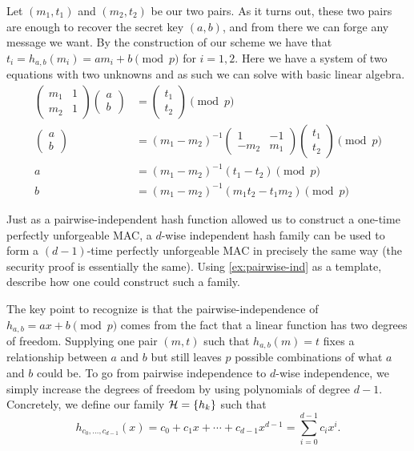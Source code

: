\documentclass[11pt]{article}
\begin{document}
\begin{answer}
  Let \((m_1, t_1)\) and \((m_2, t_2)\) be our two pairs. As it turns
  out, these two pairs are enough to recover the secret key \((a,b)\),
  and from there we can forge any message we want. By the construction
  of our scheme we have that \(t_i = h_{a,b}(m_i) = am_i + b \pmod p\)
  for \(i = 1,2\). Here we have a system of two equations with two
  unknowns and as such we can solve with basic linear algebra.
  \begin{align*}
    \begin{pmatrix} m_1 & 1 \\ m_2 & 1 \end{pmatrix} \begin{pmatrix} a \\ b
    \end{pmatrix} &= \begin{pmatrix} t_1 \\ t_2 \end{pmatrix} \pmod {p} \\
    \begin{pmatrix} a \\ b \end{pmatrix} &= (m_1 - m_2)^{-1} \begin{pmatrix} 1 &
      -1 \\ -m_2 & m_1 \end{pmatrix} \begin{pmatrix} t_1 \\ t_2 \end{pmatrix} \pmod{p} \\ 
    a &= (m_1 - m_2)^{-1} (t_1 - t_2) \pmod {p} \\
    b &= (m_1 - m_2)^{-1} (m_1t_2 - t_1m_2) \pmod{p}
  \end{align*}
\end{answer}
  
\begin{question}
  Just as a pairwise-independent hash function allowed us to construct
  a one-time perfectly unforgeable MAC, a \(d\)-wise independent hash
  family can be used to form a \((d-1)\)-time perfectly unforgeable
  MAC in precisely the same way (the security proof is essentially the
  same). Using \cref{ex:pairwise-ind} as a template, describe
  how one could construct such a family.
\end{question}

\begin{answer}
  The key point to recognize is that the pairwise-independence of
  \(h_{a,b} = ax + b \pmod{p}\) comes from the fact that a linear
  function has two degrees of freedom.  Supplying one pair \((m,t)\)
  such that \(h_{a,b}(m) = t\) fixes a relationship between \(a\) and
  \(b\) but still leaves \(p\) possible combinations of what \(a\) and
  \(b\) could be. To go from pairwise independence to \(d\)-wise
  independence, we simply increase the degrees of freedom by using
  polynomials of degree \(d-1\).  Concretely, we define our family
  \(\mathcal{H} = \{h_k\}\) such that
  \[h_{c_0, \ldots, c_{d-1}}(x) = c_0 + c_1x + \cdots + c_{d-1}x^{d-1}
    = \sum_{i=0}^{d-1} c_i x^i.\]
\end{answer}
\end{document}

